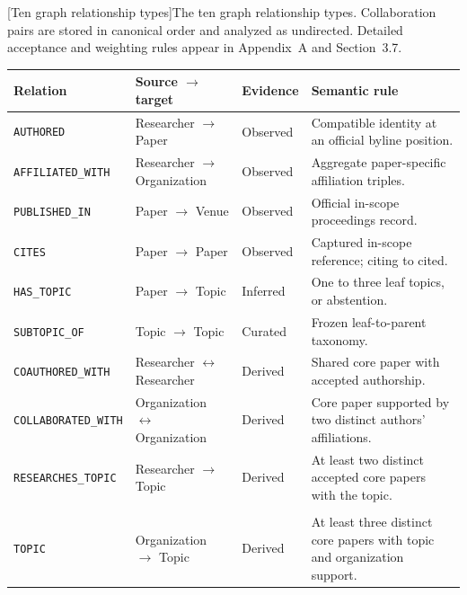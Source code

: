 \Needspace{11cm}
\begingroup
  \centering\captionsetup{hypcap=false}
  [Ten graph relationship types]{The ten graph relationship types.
  Collaboration pairs are stored in canonical order and analyzed as undirected.
  Detailed acceptance and weighting rules appear in Appendix~A and Section~3.7.}
  \label{tab:relationship-schema}
  \small
  \setlength{\tabcolsep}{4pt}
  \renewcommand{\arraystretch}{1.18}
  \begin{tabularx}{\textwidth}{>{\raggedright\arraybackslash}p{4.0cm}>{\raggedright\arraybackslash}p{2.5cm}>{\raggedright\arraybackslash}p{1.55cm}>{\raggedright\arraybackslash}X}
    \toprule
    \textbf{Relation} & \textbf{Source $\rightarrow$ target} &
    \textbf{Evidence} & \textbf{Semantic rule}\\
    \midrule
    \texttt{AUTHORED} & Researcher $\rightarrow$ Paper & Observed & Compatible identity at an official byline position.\\
    \texttt{AFFILIATED\_WITH} & Researcher $\rightarrow$ Organization & Observed & Aggregate paper-specific affiliation triples.\\
    \texttt{PUBLISHED\_IN} & Paper $\rightarrow$ Venue & Observed & Official in-scope proceedings record.\\
    \texttt{CITES} & Paper $\rightarrow$ Paper & Observed & Captured in-scope reference; citing to cited.\\
    \texttt{HAS\_TOPIC} & Paper $\rightarrow$ Topic & Inferred & One to three leaf topics, or abstention.\\
    \texttt{SUBTOPIC\_OF} & Topic $\rightarrow$ Topic & Curated & Frozen leaf-to-parent taxonomy.\\
    \texttt{COAUTHORED\_WITH} & Researcher $\leftrightarrow$ Researcher & Derived & Shared core paper with accepted authorship.\\
    \texttt{COLLABORATED\_WITH} & Organization $\leftrightarrow$ Organization & Derived & Core paper supported by two distinct authors' affiliations.\\
    \texttt{RESEARCHES\_TOPIC} & Researcher $\rightarrow$ Topic & Derived & At least two distinct accepted core papers with the topic.\\
    \makecell[l]{\texttt{CONTRIBUTES\_TO\_}\\\texttt{TOPIC}} & Organization $\rightarrow$ Topic & Derived & At least three distinct core papers with topic and organization support.\\
    \bottomrule
  \end{tabularx}\par
\endgroup
